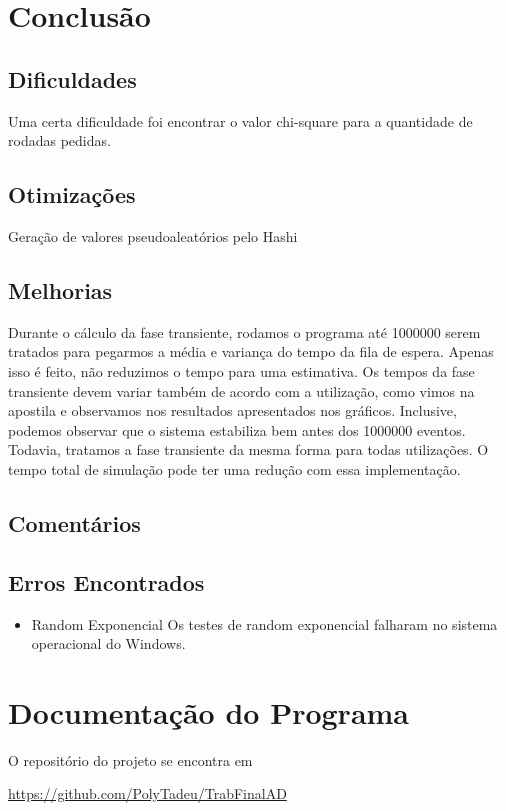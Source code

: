 \documentclass[a4paper]{article}
\begin{document}
\newpage
\section{Conclusão}
\subsection{Dificuldades}
Uma certa dificuldade foi encontrar o valor chi-square para a quantidade de rodadas pedidas.
\subsection{Otimizações}
Geração de valores pseudoaleatórios pelo Hashi
\subsection{Melhorias}

    Durante o cálculo da fase transiente, rodamos o programa até 1000000 serem tratados para pegarmos a média e variança do tempo da fila de espera. Apenas isso é feito, não reduzimos o tempo para uma estimativa. Os tempos da fase transiente devem variar também de acordo com a utilização, como vimos na apostila e observamos nos resultados apresentados nos gráficos. Inclusive, podemos observar que o sistema estabiliza bem antes dos 1000000 eventos. Todavia, tratamos a fase transiente da mesma forma para todas utilizações. O tempo total de simulação pode ter uma redução com essa implementação.
\subsection{Comentários}
\subsection{Erros Encontrados}
\begin{itemize}
    \item Random Exponencial
    Os testes de random exponencial falharam no sistema operacional do Windows.
\end{itemize}

\newpage
\section{Documentação do Programa}
O repositório do projeto se encontra em \par
\url{https://github.com/PolyTadeu/TrabFinalAD}
\end{document}
